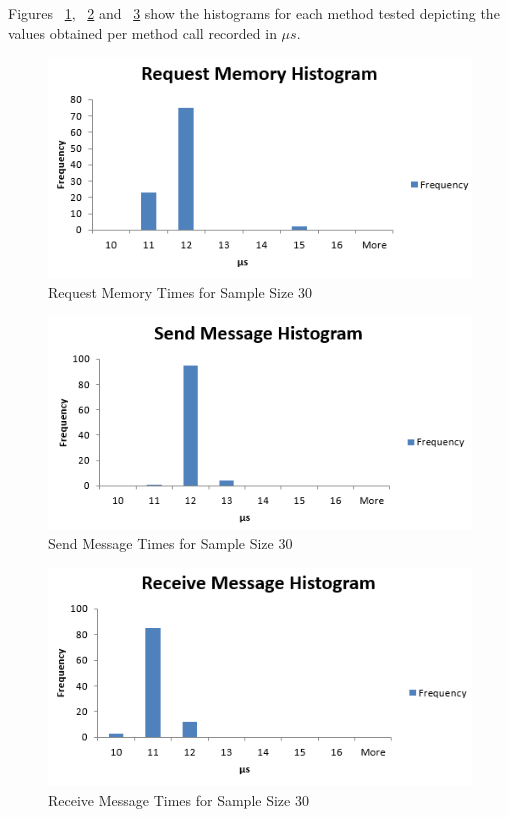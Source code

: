 \documentclass[se]{uw-wkrpt}
\begin{document}
Figures ~\ref{fig:mem}, ~\ref{fig:send} and ~\ref{fig:receive} show the histograms for each method tested depicting the values obtained per method call recorded in $\mu s$.

\begin{figure}[bp!]
\centering
\includegraphics[width=120mm]{RequestMemoryHistogram.PNG}
\caption{Request Memory Times for Sample Size 30}
\label{fig:mem}
\end{figure}

\begin{figure}[bp!]
\centering
\includegraphics[width=120mm]{SendMessageHistogram.PNG}
\caption{Send Message Times for Sample Size 30}
\label{fig:send}
\end{figure}

\begin{figure}[bp!]
\centering
\includegraphics[width=120mm]{ReceiveMessageHistogram.PNG}
\caption{Receive Message Times for Sample Size 30}
\label{fig:receive}
\end{figure}
\end{document}
